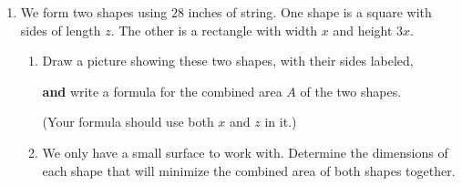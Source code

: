 \begin{enumerate}
\vfill
\newpage

\item We form two shapes using $28$ inches of string.
One shape is a square with sides of length $z$.
The other is a rectangle with width $x$ and height $3x$.

\bigskip

\begin{enumerate}
\item Draw a picture showing these two shapes, with their sides labeled,

{\bf and} write a formula for the combined area $A$ of the two shapes.

(Your formula should use both $x$ and $z$ in it.)

\vspace*{1.75in}

\item We only have a small surface to work with.  Determine the dimensions of each shape that will minimize the combined area of both shapes together.
\vfill

\end{enumerate}

\vfill



\end{enumerate}



